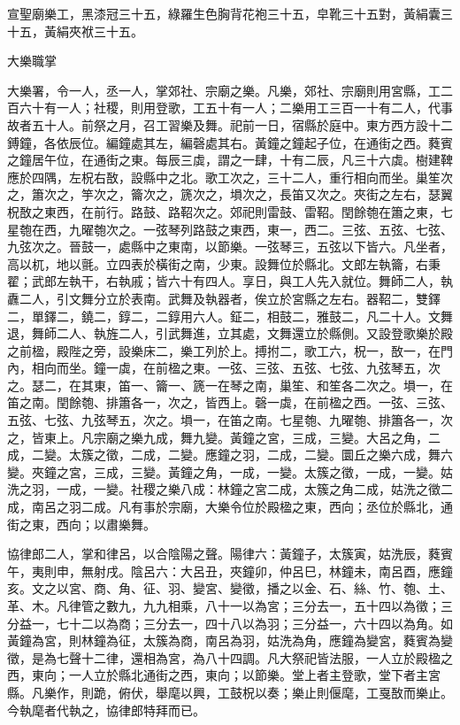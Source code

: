 \begin{pinyinscope}
 宣聖廟樂工，黑漆冠三十五，綠羅生色胸背花袍三十五，皁靴三十五對，黃絹囊三十五，黃絹夾袱三十五。



 大樂職掌



 大樂署，令一人，丞一人，掌郊社、宗廟之樂。凡樂，郊社、宗廟則用宮縣，工二百六十有一人；社稷，則用登歌，工五十有一人；二樂用工三百一十有二人，代事故者五十人。前祭之月，召工習樂及舞。祀前一日，宿縣於庭中。東方西方設十二鎛鐘，各依辰位。編鐘處其左，編磬處其右。黃鐘之鐘起子位，在通街之西。蕤賓之鐘居午位，在通街之東。每辰三虡，謂之一肆，十有二辰，凡三十六虡。樹建鞞應於四隅，左柷右敔，設縣中之北。歌工次之，三十二人，重行相向而坐。巢笙次之，簫次之，竽次之，籥次之，篪次之，塤次之，長笛又次之。夾街之左右，瑟翼柷敔之東西，在前行。路鼓、路鞀次之。郊祀則雷鼓、雷鞀。閏餘匏在簫之東，七星匏在西，九曜匏次之。一弦琴列路鼓之東西，東一，西二。三弦、五弦、七弦、九弦次之。晉鼓一，處縣中之東南，以節樂。一弦琴三，五弦以下皆六。凡坐者，高以杌，地以氈。立四表於橫街之南，少東。設舞位於縣北。文郎左執籥，右秉翟；武郎左執干，右執戚；皆六十有四人。享日，與工人先入就位。舞師二人，執纛二人，引文舞分立於表南。武舞及執器者，俟立於宮縣之左右。器鞀二，雙鐸二，單鐸二，鐃二，錞二，二錞用六人。鉦二，相鼓二，雅鼓二，凡二十人。文舞退，舞師二人、執旌二人，引武舞進，立其處，文舞還立於縣側。又設登歌樂於殿之前楹，殿陛之旁，設樂床二，樂工列於上。搏拊二，歌工六，柷一，敔一，在門內，相向而坐。鐘一虡，在前楹之東。一弦、三弦、五弦、七弦、九弦琴五，次之。瑟二，在其東，笛一、籥一、篪一在琴之南，巢笙、和笙各二次之。塤一，在笛之南。閏餘匏、排簫各一，次之，皆西上。磬一虡，在前楹之西。一弦、三弦、五弦、七弦、九弦琴五，次之。塤一，在笛之南。七星匏、九曜匏、排簫各一，次之，皆東上。凡宗廟之樂九成，舞九變。黃鐘之宮，三成，三變。大呂之角，二成，二變。太簇之徵，二成，二變。應鐘之羽，二成，二變。圜丘之樂六成，舞六變。夾鐘之宮，三成，三變。黃鐘之角，一成，一變。太簇之徵，一成，一變。姑洗之羽，一成，一變。社稷之樂八成：林鐘之宮二成，太簇之角二成，姑洗之徵二成，南呂之羽二成。凡有事於宗廟，大樂令位於殿楹之東，西向；丞位於縣北，通街之東，西向；以肅樂舞。



 協律郎二人，掌和律呂，以合陰陽之聲。陽律六：黃鐘子，太簇寅，姑洗辰，蕤賓午，夷則申，無射戌。陰呂六：大呂丑，夾鐘卯，仲呂巳，林鐘未，南呂酉，應鐘亥。文之以宮、商、角、征、羽、變宮、變徵，播之以金、石、絲、竹、匏、土、革、木。凡律管之數九，九九相乘，八十一以為宮；三分去一，五十四以為徵；三分益一，七十二以為商；三分去一，四十八以為羽；三分益一，六十四以為角。如黃鐘為宮，則林鐘為征，太簇為商，南呂為羽，姑洗為角，應鐘為變宮，蕤賓為變徵，是為七聲十二律，還相為宮，為八十四調。凡大祭祀皆法服，一人立於殿楹之西，東向；一人立於縣北通街之西，東向；以節樂。堂上者主登歌，堂下者主宮縣。凡樂作，則跪，俯伏，舉麾以興，工鼓柷以奏；樂止則偃麾，工戛敔而樂止。今執麾者代執之，協律郎特拜而已。




\end{pinyinscope}
